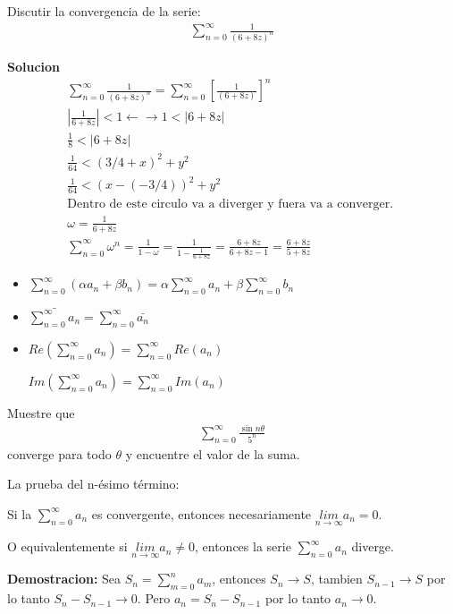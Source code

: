 \documentclass{article}
\newcommand{\caja}[3]{%
  \begin{tcolorbox}[colback=#1!5!white,colframe=#1!25!black,title=#2]
    #3
  \end{tcolorbox}%
}
\begin{document}
\caja{blue}{Ejercicio }{
  Discutir la convergencia de la serie: 
  \begin{gather*}
    \displaystyle\sum_{n= 0 }^{\infty}\frac{1}{(6 + 8z )^ {n }}
  \end{gather*}
}
\textbf{Solucion }
\begin{gather*}
  \displaystyle\sum_{n= 0 }^{\infty}\frac{1}{(6 + 8z )^ {n }} = \displaystyle\sum_{n= 0 }^{\infty}\left[\frac{1}{(6 + 8z )}\right]^ {n }\\
  \left|\frac{1}{6+ 8z }\right|< 1 \leftarrow \rightarrow 1 < \left|6 + 8z \right| \\
  \frac{1}{8} < \left|6 + 8 z \right|\\
  \frac{1}{64 } < (3/4 + x  )^ {2 } + y ^ {2 }\\
  \frac{1}{64 } < (x - (- 3/4 ))^ {2 } + y ^2\\
  \text{Dentro de este circulo va a diverger y fuera va a converger. }\\
  \omega = \frac{1}{6 + 8 z }\\
  \displaystyle\sum_{n= 0 }^{\infty} \omega ^ {n } = \frac{1}{1- \omega } = \frac{1}{1- \frac{1}{6 + 8 z }} = \frac{6 + 8 z }{6 + 8z - 1 } = \frac{6 + 8z }{5 + 8z }
\end{gather*}

\caja{green}{Propiedades }{
  \begin{itemize}
    \item $ \displaystyle\sum_{n = 0 }^{\infty}(\alpha a_n + \beta b_n) = \alpha \displaystyle\sum_{n = 0 }^{\infty}a_n + \beta \displaystyle\sum_{n = 0 }^{\infty} b_n    $
    \item $ \bar{\displaystyle\sum_{n = 0 }^{\infty}a_n} = \displaystyle\sum_{n = 0 }^{\infty} \bar{a_n } $
    \item $ Re \left(\displaystyle\sum_{n = 0 }^{\infty} a_n \right) = \displaystyle\sum_{n = 0 }^{\infty} Re(a_n ) $
    
    $Im \left(\displaystyle\sum_{n = 0 }^{\infty} a_n \right) = \displaystyle\sum_{n = 0 }^{\infty} Im(a_n )  $
  \end{itemize}
}

\caja{blue}{Titulo}{
  Muestre que 
  \begin{gather*}
    \displaystyle\sum_{n = 0 }^{\infty }\frac{\sin{n\theta }}{5 ^ {n }} 
  \end{gather*}
  converge para todo $ \theta  $ y encuentre el valor de la suma.
}

\caja{green}{Teorema }{
  La prueba del n-ésimo término: 
  
  Si la $ \sum_{n= 0 }^{\infty}a_n  $ es convergente, entonces necesariamente $ \underset{n \rightarrow \infty}{lim }a_n = 0  $. 

  O equivalentemente si $ \underset{n \rightarrow \infty}{lim }a_n \neq 0 $, entonces la serie $ \sum_{n = 0 }^{\infty}a_n  $ diverge. 
}
\textbf{Demostracion: } Sea $ S_n = \sum_{m = 0 }^{n } a_m  $, entonces $ S_n \rightarrow S  $, tambien $ S _{n- 1 } \rightarrow S  $ por lo tanto $ S_n - S _{n- 1 } \rightarrow 0  $. Pero $ a_n  = S_n - S _{n- 1 }  $ por lo tanto $ a_n \rightarrow 0  $.
\end{document}
